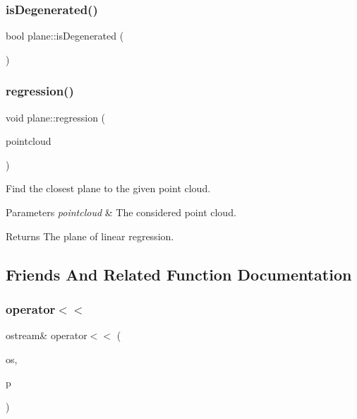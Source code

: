 \mbox{\label{classplane_a09f0be78b9c809866bca9f9b744f046e}} 
\subsubsection{is\+Degenerated()}
{\footnotesize\ttfamily bool plane\+::is\+Degenerated (\begin{DoxyParamCaption}{ }\end{DoxyParamCaption})}

\mbox{\label{classplane_add743551ece037c4918698a46db02bf7}} 
\subsubsection{regression()}
{\footnotesize\ttfamily void plane\+::regression (\begin{DoxyParamCaption}\item[{\textbf{ point3d\+Cloud}}]{pointcloud }\end{DoxyParamCaption})}



Find the closest plane to the given point cloud. 


\begin{DoxyParams}{Parameters}
{\em pointcloud} & The considered point cloud. \\
\hline
\end{DoxyParams}
\begin{DoxyReturn}{Returns}
The plane of linear regression. 
\end{DoxyReturn}


\subsection{Friends And Related Function Documentation}
\mbox{\label{classplane_ad9726324e2752901973bf9cdc8ae8c39}} 
\subsubsection{operator$<$$<$}
{\footnotesize\ttfamily ostream\& operator$<$$<$ (\begin{DoxyParamCaption}\item[{ostream \&}]{os,  }\item[{const \textbf{ plane} \&}]{p }\end{DoxyParamCaption})\hspace{0.3cm}{\ttfamily [friend]}}



